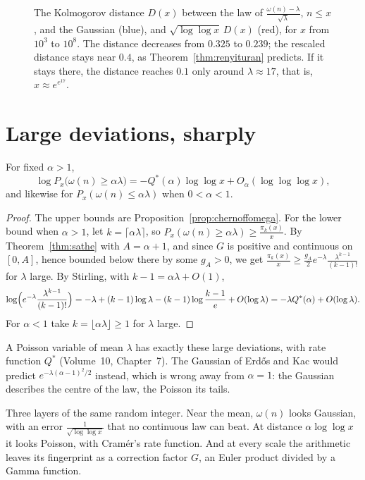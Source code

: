 \begin{figure}[ht]
\centering{}
\caption{The Kolmogorov distance $D(x)$ between the law of $\frac{\omega(n)-\lambda}{\sqrt\lambda}$, $n\le x$, and the Gaussian (blue), and $\sqrt{\log\log x}\,D(x)$ (red), for $x$ from $10^3$ to $10^8$. The distance decreases from $0.325$ to $0.239$; the rescaled distance stays near $0.4$, as Theorem~\ref{thm:renyituran} predicts. If it stays there, the distance reaches $0.1$ only around $\lambda\approx17$, that is, $x\approx e^{e^{17}}$.}
\label{fig:kolmogorov}
\end{figure}

\section{Large deviations, sharply}\label{sec:ld}

\begin{corollary}\label{cor:ldomega}
For fixed $\alpha>1$,
\[
\log P_x\bigl(\omega(n)\ge\alpha\lambda\bigr)=-Q^*(\alpha)\log\log x+O_\alpha(\log\log\log x),
\]
and likewise for $P_x(\omega(n)\le\alpha\lambda)$ when $0<\alpha<1$.
\end{corollary}
\begin{proof}
The upper bounds are Proposition~\ref{prop:chernoffomega}. For the lower bound when $\alpha>1$, let $k=\lceil\alpha\lambda\rceil$, so $P_x(\omega(n)\ge\alpha\lambda)\ge\frac{\pi_k(x)}x$. By Theorem~\ref{thm:sathe} with $A=\alpha+1$, and since $G$ is positive and continuous on $[0,A]$, hence bounded below there by some $g_A>0$, we get $\frac{\pi_k(x)}x\ge\frac{g_A}2e^{-\lambda}\frac{\lambda^{k-1}}{(k-1)!}$ for $\lambda$ large. By Stirling, with $k-1=\alpha\lambda+O(1)$,
\[
\log\Bigl(e^{-\lambda}\frac{\lambda^{k-1}}{(k-1)!}\Bigr)=-\lambda+(k-1)\log\lambda-(k-1)\log\frac{k-1}e+O(\log\lambda)=-\lambda Q^*(\alpha)+O(\log\lambda).
\]
For $\alpha<1$ take $k=\lfloor\alpha\lambda\rfloor\ge1$ for $\lambda$ large.
\end{proof}

A Poisson variable of mean $\lambda$ has exactly these large deviations, with rate function $Q^*$ (Volume~10, Chapter~7). The Gaussian of Erd\H{o}s and Kac would predict $e^{-\lambda(\alpha-1)^2/2}$ instead, which is wrong away from $\alpha=1$: the Gaussian describes the centre of the law, the Poisson its tails.

\begin{beauty}
Three layers of the same random integer. Near the mean, $\omega(n)$ looks Gaussian, with an error $\frac1{\sqrt{\log\log x}}$ that no continuous law can beat. At distance $\alpha\log\log x$ it looks Poisson, with Cramér's rate function. And at every scale the arithmetic leaves its fingerprint as a correction factor $G$, an Euler product divided by a Gamma function.
\end{beauty}

